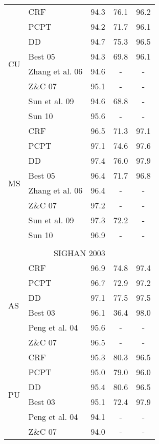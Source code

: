 \begin{table}
\begin{small}
\begin{tabular}{ l | l | c | c | c   }
\multirow{8}{*}{CU}  & CRF   &  94.3  & {76.1} & 96.2 \\
& PCPT & 94.2  & 71.7  & 96.1  \\
& DD & {94.7}  & {75.3} & {96.5}  \\
\cline{2-5}
& Best 05     & 94.3  & 69.8 & 96.1 \\
& Zhang et al. 06      & 94.6 &   - & - \\
& Z\&C 07      & 95.1 &   - & - \\
& Sun et al. 09     & 94.6  &   68.8  & - \\
& Sun 10  & 95.6  &   -  & - \\
\hline


\multirow{8}{*}{MS} &  CRF        &  96.5  & 71.3 & 97.1 \\
& PCPT &  97.1  & 74.6 & 97.6 \\
& DD &  {97.4}  & {76.0} & {97.9} \\
\cline{2-5}
& Best 05    &  96.4  &   71.7 &   96.8 \\
& Zhang et al. 06      & 96.4 &   - & - \\
& Z\&C 07      & 97.2 &   - & - \\
& Sun et al. 09  & 97.3  &   72.2  & - \\
& Sun 10  & 96.9  &   -  & - \\
\hline

\multicolumn{5}{c}{} \\
\multicolumn{5}{c}{\large{SIGHAN 2003}} \\
\hline

\multirow{6}{*}{AS} & CRF   & 96.9  & 74.8 &  97.4 \\
& PCPT & 96.7  & 72.9  & 97.2 \\
& DD & {97.1}  & {77.5}  & 97.5 \\
\cline{2-5}
 &  Best 03    &  96.1  & 36.4 &  {98.0} \\
  & Peng et al. 04      & 95.6 &   - & - \\
 & Z\&C 07      & 96.5 &   - & - \\

\hline
\multirow{6}{*}{PU}  & CRF   & 95.3  & 80.3	 & 96.5 \\
& PCPT &  95.0  & 79.0  & 96.0 \\
& DD & {95.4}	  & {80.6} & 96.5 \\
\cline{2-5}
&  Best 03       &  95.1  & 72.4 & {97.9} \\
& Peng et al. 04      & 94.1 &   - & - \\
& Z\&C 07      & 94.0 &   - & - \\


\end{tabular}
\end{small}
\end{table}
